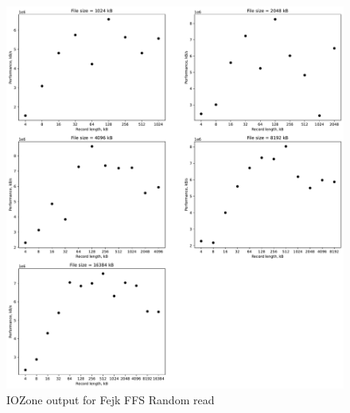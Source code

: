 \begin{figure}[!htb]
	\label{fig:app_bench_fffs_rnd_read}
	\begin{center}
		\includegraphics[width=1.0\textwidth]{figures/benchmarking/fake-ffs/Random read.pdf}
	\end{center}
	\caption{IOZone output for Fejk FFS Random read}
\end{figure}

